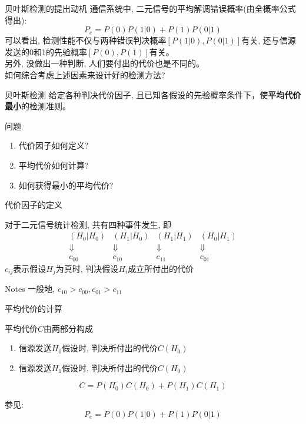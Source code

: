 \begin{frame}{贝叶斯检测的提出动机}
通信系统中, 二元信号的平均解调错误概率(由全概率公式得出):
\[ P_e=P(0)P(1|0)+P(1)P(0|1)\]
可以看出, 检测性能不仅与两种错误判决概率$[P(1|0),P(0|1)]$有关, 还与信源发送的0和1的先验概率$[P(0),P(1)]$有关。\\
另外, 没做出一种判断, 人们要付出的代价也是不同的。\\
如何综合考虑上述因素来设计好的检测方法?
\begin{block}{贝叶斯检测}
	给定各种判决代价因子, 且已知各假设的先验概率条件下，使\textbf{平均代价最小}的检测准则。
\end{block}
\end{frame}

\begin{frame}{问题}
\begin{enumerate}
	\item 代价因子如何定义?
	\item 平均代价如何计算?
	\item 如何获得最小的平均代价?
\end{enumerate}
\end{frame}

\begin{frame}{代价因子的定义}
\begin{block}{对于二元信号统计检测, 共有四种事件发生, 即}
$$
\begin{array}{cccc}
	(H_0|H_0) & (H_1|H_0) & (H_1|H_1) & (H_0|H_1)\\
	\Downarrow & \Downarrow & \Downarrow & \Downarrow\\
	c_{00} & c_{10} & c_{11} & c_{01}
\end{array}
$$
$c_{ij}$表示假设$H_j$为真时, 判决假设$H_i$成立所付出的代价
\end{block}
\begin{block}{Notes}
	一般地, $c_{10}>c_{00}, c_{01}>c_{11}$
\end{block}
\end{frame}

\begin{frame}{平均代价的计算}
\begin{block}{平均代价$C$由两部分构成}
	\begin{enumerate}
		\item 信源发送$H_0$假设时, 判决所付出的代价$C(H_0)$
		\item 信源发送$H_1$假设时, 判决所付出的代价$C(H_0)$
	\end{enumerate}
    \[C=P(H_0)C(H_0)+P(H_1)C(H_1)\]
\end{block}
参见:
\[ P_e=P(0)P(1|0)+P(1)P(0|1)\]
\end{frame}

